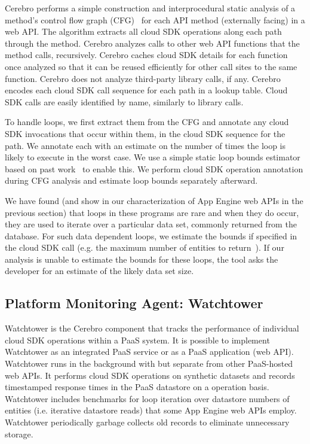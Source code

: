 Cerebro performs a simple construction and interprocedural static analysis 
of a method's control flow graph 
(CFG)~\cite{Allen:1970:CFA:800028.808479,Aho:1986:CPT:6448,Morgan:1998:BOC:288765,Muchnick:1998:ACD:286076} for each API method (externally facing) in a web API. 
The algorithm extracts all cloud SDK operations along
each path through the method.  Cerebro analyzes calls to other web API functions
that the method calls, recursively.  Cerebro caches cloud SDK details for each function 
once analyzed so that it can be reused efficiently for other call sites to the same
function. Cerebro does not analyze third-party library calls, if any.  Cerebro encodes
each cloud SDK call sequence for each path in a lookup table. Cloud SDK calls are 
easily identified by name, similarly to library calls.

To handle loops, we first extract them from the CFG and 
annotate any cloud SDK invocations that occur within them, in the cloud SDK sequence
for the path.  We annotate each with an estimate on the number of times
the loop is likely to execute in the worst case. We use a simple static
loop bounds estimator 
based on past work~\cite{bygde2010static,Gulwani:2009:CRP:1542476.1542518,Lokuciejewski:2009:FPS:1545006.1545064,Hunt:2006:PCL:1167999.1168026}
to enable this.  We perform cloud SDK operation annotation during CFG analysis
and estimate loop bounds separately afterward.

We have found (and show in our characterization of App Engine web APIs in the previous
section) that loops in these programs are rare and when they do occur, they are
used to iterate over a particular data set, commonly returned from the database.
For such data dependent loops, we estimate the bounds if specified 
in the cloud SDK call (e.g. the maximum number of 
entities to return~\cite{gae-fetch-options}).
If our analysis is unable to estimate the bounds for these loops, the tool asks
the developer for an estimate of the likely data set size.

\subsection{Platform Monitoring Agent: Watchtower}
Watchtower is the Cerebro component that tracks the performance of individual
cloud SDK operations within a PaaS system.  It is possible to implement
Watchtower as an integrated PaaS service or as a PaaS application (web API).
Watchtower runs in the background with but separate from other PaaS-hosted web APIs.
It performs cloud SDK operations on synthetic datasets and records timestamped response
times in the PaaS datastore on a operation basis.  Watchtower includes
benchmarks for loop iteration over datastore numbers of entities 
(i.e. iterative datastore reads)
that some App Engine web APIs employ.  
Watchtower periodically garbage collects old records to eliminate unnecessary storage.

